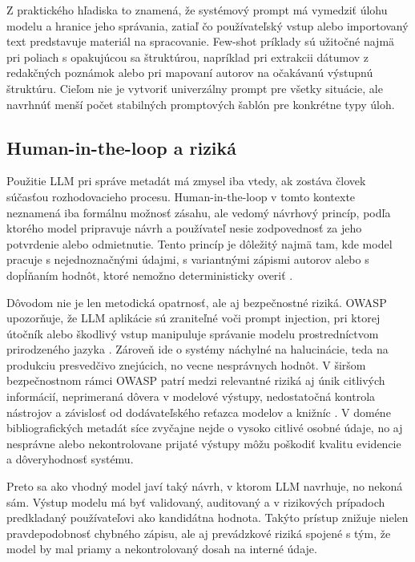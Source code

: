 Z praktického hľadiska to znamená, že systémový prompt má vymedziť úlohu modelu a hranice jeho správania, zatiaľ čo používateľský vstup alebo importovaný text predstavuje materiál na spracovanie. Few-shot príklady sú užitočné najmä pri poliach s opakujúcou sa štruktúrou, napríklad pri extrakcii dátumov z redakčných poznámok alebo pri mapovaní autorov na očakávanú výstupnú štruktúru. Cieľom nie je vytvoriť univerzálny prompt pre všetky situácie, ale navrhnúť menší počet stabilných promptových šablón pre konkrétne typy úloh.

\subsection{Human-in-the-loop a riziká}

Použitie LLM pri správe metadát má zmysel iba vtedy, ak zostáva človek súčasťou rozhodovacieho procesu. Human-in-the-loop v tomto kontexte neznamená iba formálnu možnosť zásahu, ale vedomý návrhový princíp, podľa ktorého model pripravuje návrh a používateľ nesie zodpovednosť za jeho potvrdenie alebo odmietnutie. Tento princíp je dôležitý najmä tam, kde model pracuje s nejednoznačnými údajmi, s variantnými zápismi autorov alebo s dopĺňaním hodnôt, ktoré nemožno deterministicky overiť \cite{Mikulecky2025}.

Dôvodom nie je len metodická opatrnosť, ale aj bezpečnostné riziká. OWASP upozorňuje, že LLM aplikácie sú zraniteľné voči prompt injection, pri ktorej útočník alebo škodlivý vstup manipuluje správanie modelu prostredníctvom prirodzeného jazyka \cite{OWASPPromptInjection}. Zároveň ide o systémy náchylné na halucinácie, teda na produkciu presvedčivo znejúcich, no vecne nesprávnych hodnôt. V širšom bezpečnostnom rámci OWASP patrí medzi relevantné riziká aj únik citlivých informácií, neprimeraná dôvera v modelové výstupy, nedostatočná kontrola nástrojov a závislosť od dodávateľského reťazca modelov a knižníc \cite{OWASPTop10LLM2025}. V doméne bibliografických metadát síce zvyčajne nejde o vysoko citlivé osobné údaje, no aj nesprávne alebo nekontrolovane prijaté výstupy môžu poškodiť kvalitu evidencie a dôveryhodnosť systému.

Preto sa ako vhodný model javí taký návrh, v ktorom LLM navrhuje, no nekoná sám. Výstup modelu má byť validovaný, auditovaný a v rizikových prípadoch predkladaný používateľovi ako kandidátna hodnota. Takýto prístup znižuje nielen pravdepodobnosť chybného zápisu, ale aj prevádzkové riziká spojené s tým, že model by mal priamy a nekontrolovaný dosah na interné údaje.

